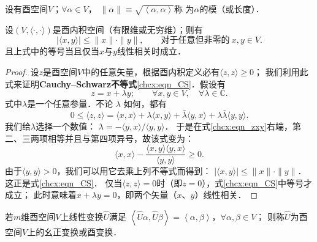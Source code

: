 \begin{definition}
    设有酉空间$V$；$\forall \alpha \in V$，
    $\|\alpha \|\equiv\sqrt{\left<\alpha,\alpha\right>}$称
    为$\alpha$的{\heiti 模}（或{\heiti 长度}）．
\end{definition}


\begin{theorem}\label{chcx:thm_CS}
	设$(V,\langle\cdot, \cdot\rangle)$是酉内积空间（有限维或无穷维）；则有
	\begin{equation}\label{chcx:eqn_CS}
		|\langle x,y \rangle| \leqslant \|x\| \cdot\|y\|,
		\qquad \text{对于任意但非零的} \ x, y \in V .
	\end{equation}
	且上式中的等号当且仅当$x$与$y$线性相关时成立．
\end{theorem}
\begin{proof}
    设$z$是酉空间$V$中的任意矢量，根据酉内积定义必有$\langle z,z \rangle \geqslant 0$；
    我们利用此式来证明{\heiti \bfseries Cauchy--Schwarz不等式}\eqref{chcx:eqn_CS}．假设有
    \begin{equation*}
    	z = x + \lambda y; \qquad \forall x, y \in V, \quad \forall\lambda \in \mathbb{C}.
    \end{equation*}
    式中$\lambda$是一个任意参量．不论 $\lambda$ 如何，都有
    \begin{equation}\label{chcx:eqn_zxy}
    	0 \leqslant \langle z,z \rangle =
    	\langle x,x \rangle + \lambda \langle x,y \rangle
    	+\bar{\lambda} \langle y,x \rangle 
    	+ \lambda \bar{\lambda} \langle y,y \rangle .
    \end{equation}
    我们给$\lambda$选择一个数值：
    $\lambda=-{\langle y , x \rangle}/{ \langle y,y\rangle}$．
    于是在式\eqref{chcx:eqn_zxy}右端，第二、三两项相等并且与第四项异号，故该式变为：
    \begin{equation*}
    	\langle x,x \rangle - \frac{\langle x,y \rangle\langle y,x \rangle}{\langle y,y \rangle} \geqslant 0.
    \end{equation*}
    由于$\langle y,y\rangle >0$，我们可以用它去乘上列不等式而得到：
    $|\langle x,y \rangle| \leqslant \|x\| \cdot\|y\|$．
    这正是式\eqref{chcx:eqn_CS}．
    仅当$\langle z,z \rangle=0$时（即$z=0$），式\eqref{chcx:eqn_CS}中等号才成立；
    此时意味着$x + \lambda y=0$，即两个矢量（$x$、$y$）线性相关．
\end{proof}


\begin{definition}
    若$m$维酉空间$V$上线性变换$\hat{U}$满足
    $\left<\hat{U}\alpha,\hat{U}\beta\right>=\left<\alpha,\beta\right>$，$\forall \alpha,\beta \in V$；
    则称$\hat{U}$为酉空间$V$上的{\heiti 幺正变换}或{\heiti 酉变换}．
\end{definition}


